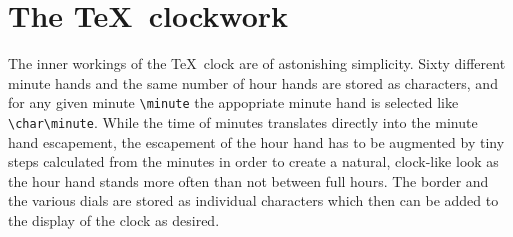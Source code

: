 \documentclass[12pt]{ltxdoc}
\begin{document}
\section{The \TeX\ clockwork}

\begin{sloppypar}
The inner workings of the \TeX\ clock are of astonishing simplicity.
Sixty different minute hands and the same number of hour hands are
stored as characters, and for any given minute \verb-\minute- the appopriate
minute hand is selected like \verb-\char\minute-. While the time
of minutes translates directly into the minute hand escapement,
the escapement of the hour hand has to be augmented by tiny steps
calculated from the minutes in order to create a natural, clock-like
look as the hour hand stands more often than not between full hours.
The border and the
various dials are stored as individual characters which then can be
added to the display of the clock as desired. 
\end{sloppypar}
\end{document}

